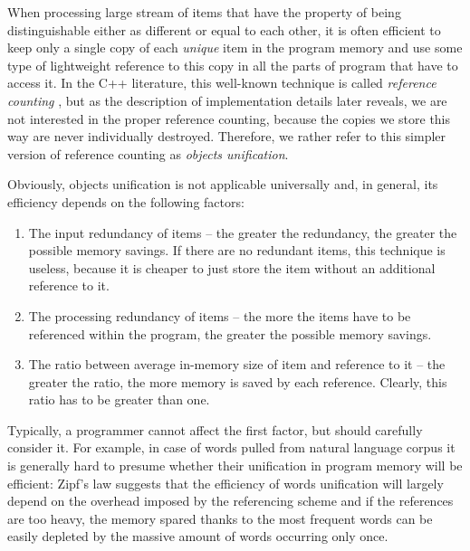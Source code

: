 When processing large stream of items that have the property of being distinguishable
either as different or equal to each other, it is often efficient to keep only a single
copy of each \emph{unique} item in the program memory and use some type of lightweight
reference to this copy in all the parts of program that have to access it.
In the C++ literature, this well-known technique is called \emph{reference counting}
\citep[Item 29]{meyers:more-effective-cpp}, but as the description of implementation
details later reveals, we are not interested in the proper reference counting,
because the copies we store this way are never individually destroyed.
Therefore, we rather refer to this simpler version of reference counting as \emph{objects
unification}.


Obviously, objects unification is not applicable universally and, in general,
its efficiency depends on the following factors:
\begin{enumerate}
  \item The input redundancy of items -- the greater the redundancy, the greater
  the possible memory savings. If there are no redundant items, this technique is useless,
  because it is cheaper to just store the item without an additional reference to it.
  \item The processing redundancy of items -- the more the items have to be
  referenced within the program, the greater the possible memory savings.
  \item The ratio between average in-memory size of item and reference to it -- the greater
  the ratio, the more memory is saved by each reference.
  Clearly, this ratio has to be greater than one.
\end{enumerate}

Typically, a programmer cannot affect the first factor, but should carefully consider it.
For example, in case of words pulled from natural language corpus it is generally hard to
presume whether their unification in program memory will be efficient:
Zipf's law \citep[Chapter 1]{manning:stat-nlp} suggests that the efficiency of words unification
will largely depend on the overhead imposed by the referencing scheme and if the references are
too heavy, the memory spared thanks to the most frequent words can be easily depleted by
the massive amount of words occurring only once.


